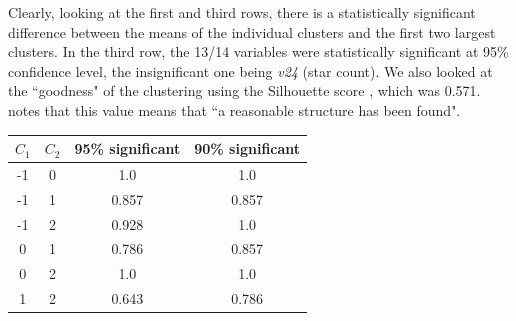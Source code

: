 \documentclass[12pt,a4paper,twocolumn]{article}
\begin{document}
Clearly, looking at the first and third rows, there is a statistically significant difference between the means of the individual clusters and the first two largest clusters. In the third row, the 13/14 variables were statistically significant at 95\% confidence level, the insignificant one being \textit{v24} (star count). We also looked at the ``goodness" of the clustering using the Silhouette score \cite{rousseeuw1987silhouettes}, which was 0.571. \cite{kaufman2009finding} notes that this value means that ``a reasonable structure has been found".\\

\begin{tabular}{|c|c|c|c|}
\hline 
$C_1$ & $C_2$ & \textbf{95\% significant} & \textbf{90\% significant} \\ 
\hline 
-1 & 0 & 1.0 & 1.0 \\ 
\hline 
-1 & 1 & 0.857 & 0.857 \\ 
\hline 
-1 & 2 & 0.928 & 1.0 \\ 
\hline 
0 & 1 & 0.786 & 0.857 \\ 
\hline 
0 & 2 & 1.0 & 1.0 \\ 
\hline 
1 & 2 & 0.643 & 0.786 \\ 
\hline 
\end{tabular} 
\begingroup
{}
\endgroup
\hfill\break



\end{document}

